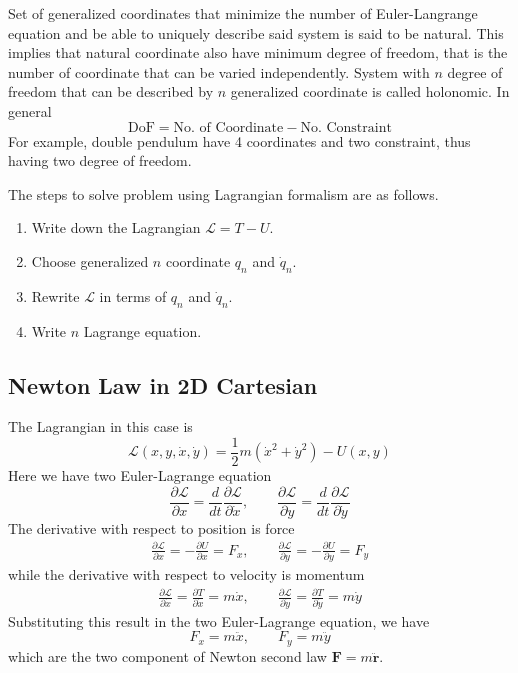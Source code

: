 \documentclass[../../../main.tex]{subfiles}
\begin{document}
Set of generalized coordinates that minimize the number of Euler-Langrange equation and be able to uniquely describe said system is said to be natural.
This implies that natural coordinate also have minimum degree of freedom, that is the number of coordinate that can be varied independently.
System with $n$ degree of freedom that can be described by $n$ generalized coordinate is called holonomic.
In general 
\begin{equation*}  \text{DoF}=\text{No. of Coordinate}-\text{No. Constraint}
\end{equation*}
For example, double pendulum have 4 coordinates and two constraint, thus having two degree of freedom.

The steps to solve problem using Lagrangian formalism are as follows.
\begin{enumerate}
  \item Write down the Lagrangian $\mathcal{L}=T-U$.
  \item Choose generalized $n$ coordinate $q_n$ and $\dot{q}_n$.
  \item Rewrite $\mathcal{L}$ in terms of $q_n$ and $\dot{q}_n$.
  \item Write $n$ Lagrange equation.
\end{enumerate}

\subsection*{Newton Law in 2D Cartesian}
The Lagrangian in this case is 
\begin{equation*}
  \mathcal{L}(x,y,\dot{x},\dot{y})=\frac{1}{2}m(\dot{x}^2+\dot{y}^2)-U(x,y)
\end{equation*}
Here we have two Euler-Lagrange equation
\begin{equation*}
  \frac{\partial \mathcal{L}}{\partial x}=\frac{d}{dt}\frac{\partial \mathcal{L}}{\partial \dot{x}},\qquad
  \frac{\partial \mathcal{L}}{\partial y}=\frac{d}{dt}\frac{\partial \mathcal{L}}{\partial \dot{y}}
\end{equation*}
The derivative with respect to position is force
\begin{align*}
  \frac{\partial \mathcal{L}}{\partial x}=-\frac{\partial U}{\partial x}=F_x,\qquad
  \frac{\partial \mathcal{L}}{\partial y}=-\frac{\partial U}{\partial y}=F_y
\end{align*}
while the derivative with respect to velocity is momentum
\begin{align*}
  \frac{\partial\mathcal{L}}{\partial \dot{x}}=\frac{\partial T}{\partial \dot{x}}=m\dot{x}, \qquad
  \frac{\partial\mathcal{L}}{\partial \dot{y}}=\frac{\partial T}{\partial \dot{y}}=m\dot{y}
\end{align*}
Substituting this result in the two Euler-Lagrange equation, we have 
\begin{equation*}
  F_x=m\ddot{x},\qquad F_y=m\ddot{y}
\end{equation*}
which are the two component of Newton second law $\mathbf{F}=m\mathbf{\ddot{r}}$.
\end{document}
